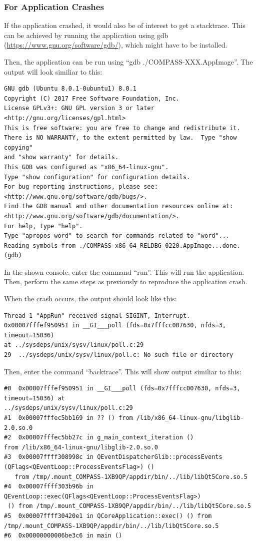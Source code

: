 \subsubsection{For Application Crashes}

If the application crashed, it would also be of interest to get a stacktrace. This can be achieved by running the application using gdb (\url{https://www.gnu.org/software/gdb/}), which might have to be installed.

Then, the application can be run using ``gdb ./COMPASS-XXX.AppImage''. The output will look similiar to this:

\begin{verbatim}
GNU gdb (Ubuntu 8.0.1-0ubuntu1) 8.0.1
Copyright (C) 2017 Free Software Foundation, Inc.
License GPLv3+: GNU GPL version 3 or later <http://gnu.org/licenses/gpl.html>
This is free software: you are free to change and redistribute it.
There is NO WARRANTY, to the extent permitted by law.  Type "show copying"
and "show warranty" for details.
This GDB was configured as "x86_64-linux-gnu".
Type "show configuration" for configuration details.
For bug reporting instructions, please see:
<http://www.gnu.org/software/gdb/bugs/>.
Find the GDB manual and other documentation resources online at:
<http://www.gnu.org/software/gdb/documentation/>.
For help, type "help".
Type "apropos word" to search for commands related to "word"...
Reading symbols from ./COMPASS-x86_64_RELDBG_0220.AppImage...done.
(gdb) 
\end{verbatim}


In the shown console, enter the command ``run''. This will run the application. Then, perform the same steps as previously to reproduce the application crash.

When the crash occurs, the output should look like this:

\begin{verbatim}
Thread 1 "AppRun" received signal SIGINT, Interrupt.
0x00007fffef950951 in __GI___poll (fds=0x7fffcc007630, nfds=3, timeout=15036) 
at ../sysdeps/unix/sysv/linux/poll.c:29
29	../sysdeps/unix/sysv/linux/poll.c: No such file or directory
\end{verbatim}

Then, enter the command ``backtrace''. This will show output similiar to this:

\begin{verbatim}
#0  0x00007fffef950951 in __GI___poll (fds=0x7fffcc007630, nfds=3, timeout=15036) at 
../sysdeps/unix/sysv/linux/poll.c:29
#1  0x00007fffec5bb169 in ?? () from /lib/x86_64-linux-gnu/libglib-2.0.so.0
#2  0x00007fffec5bb27c in g_main_context_iteration () 
from /lib/x86_64-linux-gnu/libglib-2.0.so.0
#3  0x00007ffff308998c in QEventDispatcherGlib::processEvents
(QFlags<QEventLoop::ProcessEventsFlag>) ()
   from /tmp/.mount_COMPASS-1XB9QP/appdir/bin/../lib/libQt5Core.so.5
#4  0x00007ffff303b96b in QEventLoop::exec(QFlags<QEventLoop::ProcessEventsFlag>)
 () from /tmp/.mount_COMPASS-1XB9QP/appdir/bin/../lib/libQt5Core.so.5
#5  0x00007ffff30420e1 in QCoreApplication::exec() () from 
/tmp/.mount_COMPASS-1XB9QP/appdir/bin/../lib/libQt5Core.so.5
#6  0x00000000006be3c6 in main ()
\end{verbatim}

